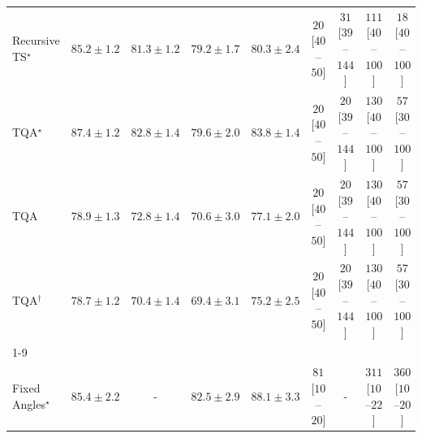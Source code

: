 \begin{tabular}{l|cccc|cccc|}
Recursive TS$^\star$ & {\cellcolor[HTML]{005B32}} \color[HTML]{F1F1F1} $85.2\pm 1.2$ & {\cellcolor[HTML]{12763D}} \color[HTML]{F1F1F1} $81.3\pm 1.2$ & {\cellcolor[HTML]{228343}} \color[HTML]{F1F1F1} $79.2\pm 1.7$ & {\cellcolor[HTML]{1A7D40}} \color[HTML]{F1F1F1} $80.3\pm 2.4$ & {\cellcolor[HTML]{FFF4F0}} \color[HTML]{000000} $20$ [$40$--$50$] & {\cellcolor[HTML]{FFF2EE}} \color[HTML]{000000} $31$ [$39$--$144$] & {\cellcolor[HTML]{FDE0DD}} \color[HTML]{000000} $111$ [$40$--$100$] & {\cellcolor[HTML]{FFF5F1}} \color[HTML]{000000} $18$ [$40$--$100$] \\
TQA$^\star$ & {\cellcolor[HTML]{004A2B}} \color[HTML]{F1F1F1} $87.4\pm 1.2$ & {\cellcolor[HTML]{076D39}} \color[HTML]{F1F1F1} $82.8\pm 1.4$ & {\cellcolor[HTML]{208242}} \color[HTML]{F1F1F1} $79.6\pm 2.0$ & {\cellcolor[HTML]{006636}} \color[HTML]{F1F1F1} $83.8\pm 1.4$ & {\cellcolor[HTML]{FFF4F0}} \color[HTML]{000000} $20$ [$40$--$50$] & {\cellcolor[HTML]{FFF4F0}} \color[HTML]{000000} $20$ [$39$--$144$] & {\cellcolor[HTML]{FDDBD7}} \color[HTML]{000000} $130$ [$40$--$100$] & {\cellcolor[HTML]{FEECE9}} \color[HTML]{000000} $57$ [$30$--$100$] \\
TQA & {\cellcolor[HTML]{258745}} \color[HTML]{F1F1F1} $78.9\pm 1.3$ & {\cellcolor[HTML]{5AB76A}} \color[HTML]{F1F1F1} $72.8\pm 1.4$ & {\cellcolor[HTML]{74C477}} \color[HTML]{000000} $70.6\pm 3.0$ & {\cellcolor[HTML]{31974F}} \color[HTML]{F1F1F1} $77.1\pm 2.0$ & {\cellcolor[HTML]{FFF4F0}} \color[HTML]{000000} $20$ [$40$--$50$] & {\cellcolor[HTML]{FFF4F0}} \color[HTML]{000000} $20$ [$39$--$144$] & {\cellcolor[HTML]{FDDBD7}} \color[HTML]{000000} $130$ [$40$--$100$] & {\cellcolor[HTML]{FEECE9}} \color[HTML]{000000} $57$ [$30$--$100$] \\
TQA$^\dagger$ & {\cellcolor[HTML]{268846}} \color[HTML]{F1F1F1} $78.7\pm 1.2$ & {\cellcolor[HTML]{77C679}} \color[HTML]{000000} $70.4\pm 1.4$ & {\cellcolor[HTML]{83CB7D}} \color[HTML]{000000} $69.4\pm 3.1$ & {\cellcolor[HTML]{3EA75A}} \color[HTML]{F1F1F1} $75.2\pm 2.5$ & {\cellcolor[HTML]{FFF4F0}} \color[HTML]{000000} $20$ [$40$--$50$] & {\cellcolor[HTML]{FFF4F0}} \color[HTML]{000000} $20$ [$39$--$144$] & {\cellcolor[HTML]{FDDBD7}} \color[HTML]{000000} $130$ [$40$--$100$] & {\cellcolor[HTML]{FEECE9}} \color[HTML]{000000} $57$ [$30$--$100$] \\
\cline{1-9}
\multicolumn{9}{c}{\rule{0pt}{8pt}SV} \\
\midrule
Fixed Angles$^\star$ & {\cellcolor[HTML]{034C78}} \color[HTML]{F1F1F1} $85.4\pm 2.2$ & {\cellcolor[HTML]{000000}} \color[HTML]{F1F1F1} {\cellcolor{white}} \color{black} - & {\cellcolor[HTML]{046096}} \color[HTML]{F1F1F1} $82.5\pm 2.9$ & {\cellcolor[HTML]{023858}} \color[HTML]{F1F1F1} $88.1\pm 3.3$ & {\cellcolor[HTML]{FEE6E3}} \color[HTML]{000000} $81$ [$10$--$20$] & {\cellcolor[HTML]{000000}} \color[HTML]{F1F1F1} {\cellcolor{white}} \color{black} - & {\cellcolor[HTML]{FAA1B6}} \color[HTML]{000000} $311$ [$10$--$22$] & {\cellcolor[HTML]{F986AC}} \color[HTML]{F1F1F1} $360$ [$10$--$20$] \\

\end{tabular}
